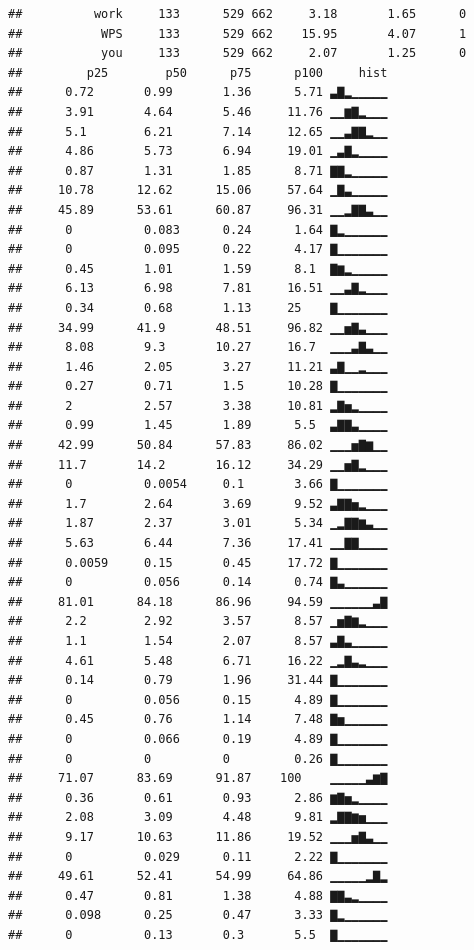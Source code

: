 \documentclass[]{apa6}
\theoremstyle{definition}
\theoremstyle{definition}
\theoremstyle{definition}
\theoremstyle{remark}
\begin{document}
\begin{verbatim}
##          work     133      529 662     3.18       1.65      0   
##           WPS     133      529 662    15.95       4.07      1   
##           you     133      529 662     2.07       1.25      0   
##         p25        p50      p75      p100     hist
##      0.72       0.99       1.36      5.71 ▃▇▂▁▁▁▁▁
##      3.91       4.64       5.46     11.76 ▁▁▆▇▂▁▁▁
##      5.1        6.21       7.14     12.65 ▁▁▃▇▇▂▁▁
##      4.86       5.73       6.94     19.01 ▁▃▇▂▁▁▁▁
##      0.87       1.31       1.85      8.71 ▇▇▂▁▁▁▁▁
##     10.78      12.62      15.06     57.64 ▁▇▃▁▁▁▁▁
##     45.89      53.61      60.87     96.31 ▁▁▂▇▇▃▁▁
##      0          0.083      0.24      1.64 ▇▂▁▁▁▁▁▁
##      0          0.095      0.22      4.17 ▇▁▁▁▁▁▁▁
##      0.45       1.01       1.59      8.1  ▇▆▂▁▁▁▁▁
##      6.13       6.98       7.81     16.51 ▁▁▃▇▂▁▁▁
##      0.34       0.68       1.13     25    ▇▁▁▁▁▁▁▁
##     34.99      41.9       48.51     96.82 ▁▁▅▇▃▁▁▁
##      8.08       9.3       10.27     16.7  ▁▁▁▃▇▃▁▁
##      1.46       2.05       3.27     11.21 ▃▇▁▁▂▁▁▁
##      0.27       0.71       1.5      10.28 ▇▁▁▁▁▁▁▁
##      2          2.57       3.38     10.81 ▂▇▅▂▁▁▁▁
##      0.99       1.45       1.89      5.5  ▃▇▇▃▁▁▁▁
##     42.99      50.84      57.83     86.02 ▁▁▁▅▇▆▁▁
##     11.7       14.2       16.12     34.29 ▁▁▅▇▂▁▁▁
##      0          0.0054     0.1       3.66 ▇▁▁▁▁▁▁▁
##      1.7        2.64       3.69      9.52 ▃▇▇▅▂▁▁▁
##      1.87       2.37       3.01      5.34 ▁▂▇▇▆▃▁▁
##      5.63       6.44       7.36     17.41 ▁▁▇▇▁▁▁▁
##      0.0059     0.15       0.45     17.72 ▇▁▁▁▁▁▁▁
##      0          0.056      0.14      0.74 ▇▃▁▁▁▁▁▁
##     81.01      84.18      86.96     94.59 ▁▁▁▁▁▁▃▇
##      2.2        2.92       3.57      8.57 ▁▅▇▆▂▁▁▁
##      1.1        1.54       2.07      8.57 ▃▇▃▁▁▁▁▁
##      4.61       5.48       6.71     16.22 ▁▂▇▃▂▁▁▁
##      0.14       0.79       1.96     31.44 ▇▁▁▁▁▁▁▁
##      0          0.056      0.15      4.89 ▇▁▁▁▁▁▁▁
##      0.45       0.76       1.14      7.48 ▇▅▁▁▁▁▁▁
##      0          0.066      0.19      4.89 ▇▁▁▁▁▁▁▁
##      0          0          0         0.26 ▇▁▁▁▁▁▁▁
##     71.07      83.69      91.87    100    ▁▁▁▁▁▃▆▇
##      0.36       0.61       0.93      2.86 ▆▇▅▂▁▁▁▁
##      2.08       3.09       4.48      9.81 ▂▇▇▆▅▁▁▁
##      9.17      10.63      11.86     19.52 ▁▁▁▅▇▃▁▁
##      0          0.029      0.11      2.22 ▇▁▁▁▁▁▁▁
##     49.61      52.41      54.99     64.86 ▁▁▁▁▁▂▇▂
##      0.47       0.81       1.38      4.88 ▇▇▃▂▁▁▁▁
##      0.098      0.25       0.47      3.33 ▇▂▁▁▁▁▁▁
##      0          0.13       0.3       5.5  ▇▁▁▁▁▁▁▁

\end{verbatim}
\end{document}
